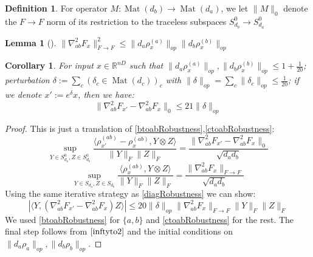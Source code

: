 \documentclass[aos]{imsart}
\newtheorem{corollary}[theorem]{Corollary}
\newtheorem{lemma}[theorem]{Lemma}
\theoremstyle{definition}
\newtheorem{definition}[theorem]{Definition}
\numberwithin{equation}{section}
\DeclareMathOperator{\mat}{Mat}
\newcommand{\R}{{\mathbb{R}}}
\newcommand{\smallSym}{S}
\newcommand{\samp}{x}
\newcommand{\AR}[1]{{\color{orange}[AR: #1]}}
\begin{document}
\begin{appendix}
\begin{definition}
For operator $M : \mat(d_{b}) \to \mat(d_{a})$, we let $\|M\|_{0}$ denote the $F \to F$ norm of its restriction to the traceless subspaces $\smallSym^0_{d_b} \to \smallSym^0_{d_a}$
\end{definition}

\begin{lemma}[\cite{KLR19}] \label{inftyto2}
$\|\nabla^{2}_{ab} F_{\samp}\|_{F \to F}^{2} \leq \|d_{a} \rho_{\samp}^{(a)}\|_{op} \|d_{b} \rho_{\samp}^{(b)}\|_{op}$
\end{lemma}

\begin{corollary} \label{offdiagRobustness}
For input $\samp \in \R^{nD}$ such that $\|d_{a} \rho_{\samp}^{(a)}\|_{op}, \|d_{b} \rho_{\samp}^{(b)}\|_{op} \leq 1+\frac{1}{20}$; perturbation $\delta := \sum_{c} (\delta_{c} \in \mat(d_{c}))_{c}$ with $\|\delta\|_{op} = \sum_{c} \|\delta_{c}\|_{op} \leq \frac{1}{20}$; if we denote $\samp' := e^{\delta} \samp$, then we have:
\[ \|\nabla^{2}_{ab} F_{\samp'} - \nabla^{2}_{ab} F_{\samp}\|_{0} \leq 21 \|\delta\|_{op}  \]
\end{corollary}
\begin{proof}
This is just a translation of \cref{btoabRobustness},\cref{ctoabRobustness}:
\[ \sup_{Y \in \smallSym_{d_{a}}^{0}, Z \in \smallSym_{d_{b}}^{0}} \frac{\langle \rho_{\samp'}^{(ab)} - \rho_{\samp}^{(ab)}, Y \otimes Z \rangle}{\|Y\|_{F} \|Z\|_{F}} = \frac{\|\nabla^{2}_{ab} F_{\samp'} - \nabla^{2}_{ab} F_{\samp}\|_{0}}{\sqrt{d_{a} d_{b}} } \]
\[ \sup_{Y \in \smallSym_{d_{a}}, Z \in \smallSym_{d_{b}}} \frac{\langle \rho_{\samp}^{(ab)}, Y \otimes Z \rangle}{\|Y\|_{F} \|Z\|_{F}} = \frac{\|\nabla^{2}_{ab} F_{\samp}\|_{F \to F}}{\sqrt{d_{a} d_{b}} }       \]
Using the same iterative strategy as \cref{diagRobustness} we can show:
\[ |\langle Y, (\nabla^{2}_{ab} F_{\samp'} - \nabla^{2}_{ab} F_{\samp}) Z \rangle| \leq 20 \|\delta\|_{op} \|\nabla^{2}_{ab} F_{\samp}\|_{F \to F} \|Y\|_{F} \|Z\|_{F}    \]
We used \cref{btoabRobustness} for $\{a,b\}$ and \cref{ctoabRobustness} for the rest. The final step follows from $\cref{inftyto2}$ and the initial conditions on $\|d_{a} \rho_{a}\|_{op}, \|d_{b} \rho_{b}\|_{op}$.
\end{proof}


\end{appendix}
\end{document}
